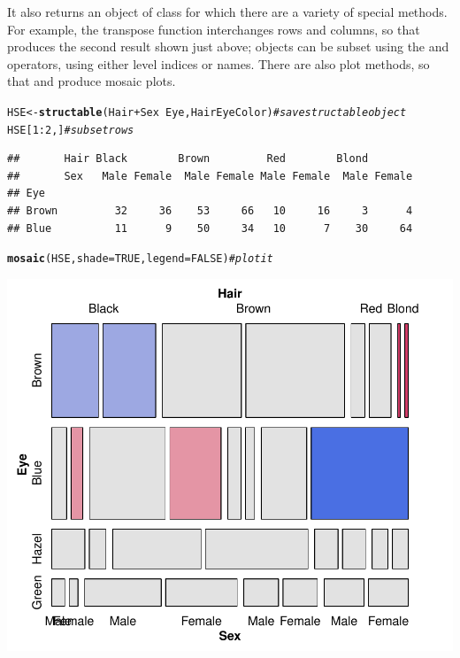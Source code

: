\documentclass[11pt]{book}\usepackage[]{graphicx}\usepackage[]{color}
\makeatletter
\newcommand{\hlnum}[1]{\textcolor[rgb]{0.686,0.059,0.569}{#1}}%
\newcommand{\hlcom}[1]{\textcolor[rgb]{0.678,0.584,0.686}{\textit{#1}}}%
\newcommand{\hlopt}[1]{\textcolor[rgb]{0,0,0}{#1}}%
\newcommand{\hlstd}[1]{\textcolor[rgb]{0.345,0.345,0.345}{#1}}%
\newcommand{\hlkwb}[1]{\textcolor[rgb]{0.69,0.353,0.396}{#1}}%
\newcommand{\hlkwc}[1]{\textcolor[rgb]{0.333,0.667,0.333}{#1}}%
\newcommand{\hlkwd}[1]{\textcolor[rgb]{0.737,0.353,0.396}{\textbf{#1}}}%
\newenvironment{kframe}{%
 \def\at@end@of@kframe{}%
 \ifinner\ifhmode%
  \def\at@end@of@kframe{\end{minipage}}%
  \begin{minipage}{\columnwidth}%
 \fi\fi%
 \def\FrameCommand##1{\hskip\@totalleftmargin \hskip-\fboxsep
 \colorbox{shadecolor}{##1}\hskip-\fboxsep
     \hskip-\linewidth \hskip-\@totalleftmargin \hskip\columnwidth}%
 \MakeFramed {\advance\hsize-\width
   \@totalleftmargin\z@ \linewidth\hsize
   \@setminipage}}%
 {\par\unskip\endMakeFramed%
 \at@end@of@kframe}
\newenvironment{knitrout}{}{} %
\renewenvironment{knitrout}{\small\renewcommand{\baselinestretch}{.85}}{} %
\makeatother
\begin{document}
It also returns an object of class  for which there are a
variety of special methods.  For example, the transpose function 
interchanges rows and columns, so that 
produces the second result shown just above;
 objects can be subset using the 
\code{[} and \code{[[} operators, using either level indices or names.
There are also plot methods, so that  and 
produce mosaic plots.
\begin{knitrout}
\color{fgcolor}\begin{kframe}
\begin{alltt}
\hlstd{HSE} \hlkwb{<-} \hlkwd{structable}\hlstd{(Hair}\hlopt{+}\hlstd{Sex} \hlopt{~} \hlstd{Eye, HairEyeColor)}   \hlcom{# save structable object}
\hlstd{HSE[}\hlnum{1}\hlopt{:}\hlnum{2}\hlstd{,]}                                         \hlcom{# subset rows}
\end{alltt}
\begin{verbatim}
##       Hair Black        Brown         Red        Blond       
##       Sex   Male Female  Male Female Male Female  Male Female
## Eye                                                          
## Brown         32     36    53     66   10     16     3      4
## Blue          11      9    50     34   10      7    30     64
\end{verbatim}
\begin{alltt}
\hlkwd{mosaic}\hlstd{(HSE,} \hlkwc{shade}\hlstd{=}\hlnum{TRUE}\hlstd{,} \hlkwc{legend}\hlstd{=}\hlnum{FALSE}\hlstd{)}             \hlcom{# plot it}
\end{alltt}
\end{kframe}

\centerline{\includegraphics[width=.7\textwidth]{ch02/fig/structable1} }



\end{knitrout}
\end{document}
